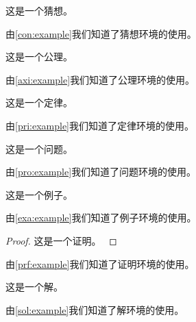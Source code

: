 \begin{conjecture}
	这是一个猜想。
	\label{con:example}
\end{conjecture}
由\cref{con:example}我们知道了猜想环境的使用。

\begin{axiom}
	这是一个公理。
	\label{axi:example}
\end{axiom}
由\cref{axi:example}我们知道了公理环境的使用。

\begin{principle}
	这是一个定律。
	\label{pri:example}
\end{principle}
由\cref{pri:example}我们知道了定律环境的使用。

\begin{problem}
	这是一个问题。
	\label{pro:example}
\end{problem}
由\cref{pro:example}我们知道了问题环境的使用。

\begin{example}
	这是一个例子。
	\label{exa:example}
\end{example}
由\cref{exa:example}我们知道了例子环境的使用。

\begin{proof}
	这是一个证明。
	\label{prf:example}
\end{proof}
由\cref{prf:example}我们知道了证明环境的使用。

\begin{solution}
	这是一个解。
	\label{sol:example}
\end{solution}
由\cref{sol:example}我们知道了解环境的使用。
